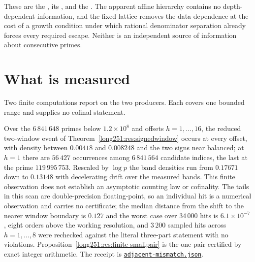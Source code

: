 \documentclass[11pt]{article}
\begin{document}
\noindent These are the
, its
, and the
.  The apparent affine hierarchy contains no depth-dependent
information, and the fixed lattice removes the data dependence at the cost of a
growth condition under which rational denominator separation already forces
every required escape.  Neither is an independent source of information about
consecutive primes.

\section{What is measured}\label{long251:sec:measurements}

Two finite computations report on the two producers.  Each covers one bounded
range and supplies no cofinal statement.

Over the $6\,841\,648$ primes below $1.2\times10^{8}$ and offsets
$h=1,\ldots,16$, the reduced two-window event of
Theorem~\ref{long251:res:signedwindow} occurs at every offset, with density between
$0.00418$ and $0.008248$ and the two signs near balanced; at $h=1$ there are
$56\,427$ occurrences among $6\,841\,564$ candidate indices, the last at the
prime $119\,995\,753$.  Rescaled by $\log p$ the band densities run from
$0.17671$ down to $0.13148$ with decelerating drift over the measured bands.
This finite observation does not establish an asymptotic counting law or
cofinality.  The tails in this scan are double-precision
floating-point, so an individual hit is a numerical observation and carries no
certificate; the median distance from the shift to the nearer window boundary
is $0.127$ and the worst case over $34\,000$ hits is $6.1\times10^{-7}$, eight
orders above the working resolution, and $3\,200$ sampled hits across
$h=1,\ldots,8$ were rechecked against the literal three-part statement with no
violations.  Proposition~\ref{long251:res:finite-smallpair} is the one pair certified
by exact integer arithmetic.  The receipt is
\href{https://github.com/wcook04/plectis-erdos/blob/dd6cc708f650f061de06594eba6ba43878f4de31/research/experiments/erdos251/receipts/adjacent-mismatch.json}{\texttt{adjacent-mismatch.json}}.
\end{document}

